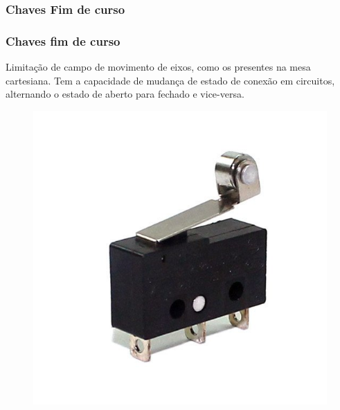 \subsubsection{Chaves Fim de curso}

\begin{frame}
\frametitle{Chaves fim de curso}

Limitação de campo de movimento de eixos, como os presentes na mesa cartesiana. Tem a capacidade de mudança de estado de conexão em circuitos, alternando o estado de aberto para fechado e vice-versa.

\begin{figure}
\centering
\includegraphics[scale = 0.3]{figs/chavefimdecurso}
\end{figure}

\end{frame}

